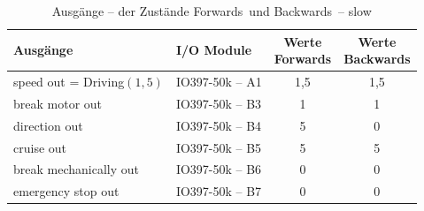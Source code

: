 \pagebreak[1]
\begin{table}[!ht]
	\centering
	\caption{Ausgänge – der Zustände \frqq Forwards\flqq\ und \frqq Backwards\flqq\ –  \frqq slow\flqq}
	\label{Automat_man:tab:z_V_langsam}
	\begin{tabular}{llcc}
		\hline
		\textbf{Ausgänge}                               & \textbf{I/O Module}                 & \makecell{\textbf{Werte}       \\ \textbf{\frqq Forwards\flqq}} & \makecell{\textbf{Werte}     \\ \textbf{\frqq Backwards\flqq}}  \\ \hline
		\multicolumn{1}{l|}{speed out = Driving$(1,5)$} & \multicolumn{1}{l|}{IO397-50k – A1} & 1,5                      & 1,5 \\
		\multicolumn{1}{l|}{break motor out}            & \multicolumn{1}{l|}{IO397-50k – B3} & 1                        & 1   \\
		\multicolumn{1}{l|}{direction out}              & \multicolumn{1}{l|}{IO397-50k – B4} & 5                        & 0   \\
		\multicolumn{1}{l|}{cruise out}                 & \multicolumn{1}{l|}{IO397-50k – B5} & 5                        & 5   \\
		\multicolumn{1}{l|}{break mechanically out}     & \multicolumn{1}{l|}{IO397-50k – B6} & 0                        & 0   \\
		\multicolumn{1}{l|}{emergency stop out}         & \multicolumn{1}{l|}{IO397-50k – B7} & 0                        & 0   \\ \hline
	\end{tabular}
\end{table}
\pagebreak[1]

